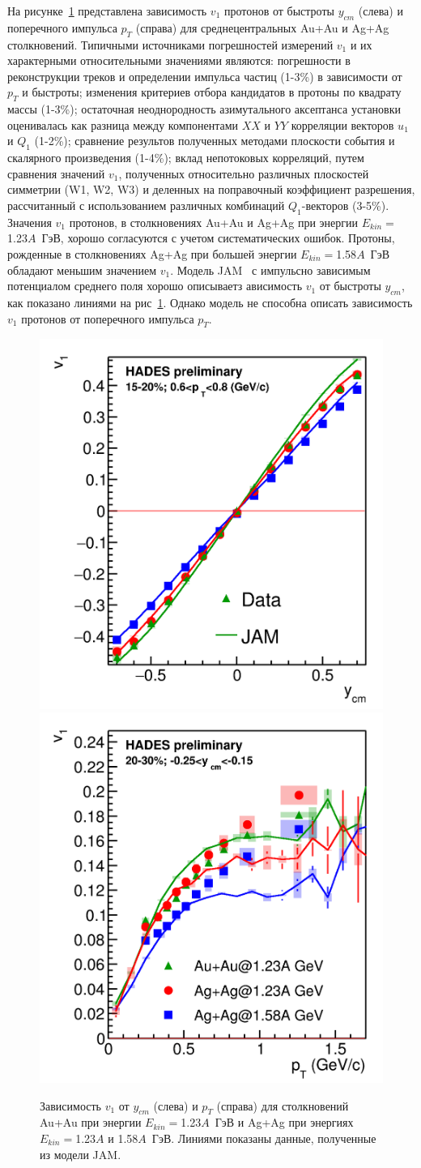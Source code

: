 На рисунке~\ref{fig:hades_v1_ycm_pT} представлена зависимость  $v_1$ протонов от быстроты  $y_{cm}$  (слева) и поперечного импульса $p_T$ (справа) для среднецентральных
 Au+Au  и  Ag+Ag  столкновений. 
 Типичными источниками погрешностей измерений $v_1$ и их характерными
относительными значениями являются:  погрешности в реконструкции треков и определении
импульса частиц (1-3\%) в зависимости от $p_T$ и быстроты; из­менения критериев отбора кандидатов в протоны по квадрату массы (1-3\%); 
остаточная неоднородность азимутального аксептанса установки оценивалась как разница между компонентами $XX$ и $YY$ корреляции векторов $u_1$ и $Q_1$ (1-2\%);
сравнение результов полученных методами плоскости события и скалярного произведения (1-4\%); вклад непотоковых корреляций, путем сравнения 
значений $v_1$, полученных относительно различных плоскостей симметрии (W1, W2, W3) и
деленных на поправочный коэффициент разрешения, рассчитанный с использованием различных комбинаций $Q_1$-векторов (3-5\%).\\
 Значения $v_1$ протонов, в столкновениях Au+Au и Ag+Ag при  энергии $E_{kin}=$1.23$A$~ГэВ, хорошо согласуются с учетом систематических ошибок. 
 Протоны, рожденные в столкновениях Ag+Ag при большей энергии $E_{kin}=$1.58$A$~ГэВ обладают меньшим значением $v_1$.
 Модель JAM~\cite{nara2019jam} с импульсно зависимым потенциалом среднего поля хорошо описываетз ависимость $v_1$ от быстроты $y_{cm}$, как показано линиями на
 рис~\ref{fig:hades_v1_ycm_pT}.
Однако модель не способна описать зависимость $v_1$ протонов от поперечного импульса $p_T$.
%
\begin{figure}[h]
\begin{center}
\includegraphics[width=0.4\linewidth]{images/v1_hades_ycm.png}
\includegraphics[width=0.4\linewidth]{images/v1_hades_pT.png}
\caption{Зависимость $v_1$ от  $y_{cm}$ (слева)  и $p_T$ (справа) для столкновений Au+Au при энергии $E_{kin}=$1.23$A$~ГэВ
  и Ag+Ag при энергиях $E_{kin}=$1.23$A$ и 1.58$A$~ГэВ. Линиями показаны данные, полученные из модели JAM.}
\label{fig:hades_v1_ycm_pT}
\end{center}
\end{figure}

